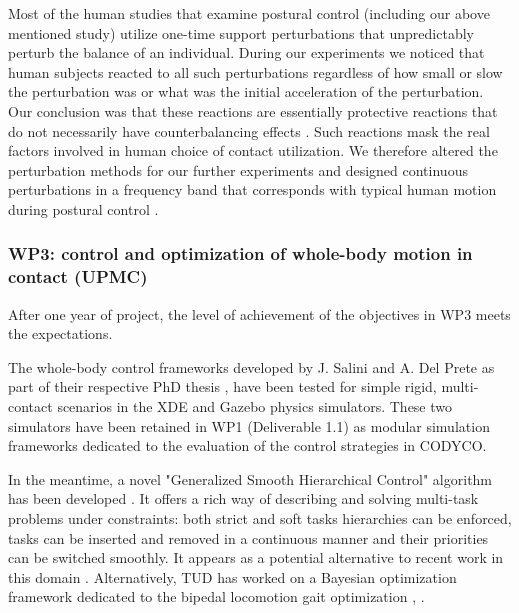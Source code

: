 \documentclass[12pt,a4paper,twoside]{article}
\begin{document}
Most of the human studies that examine postural control \cite{Horak1986, Henry1998, Dimitrova2004} (including our above mentioned study) utilize one-time support perturbations that unpredictably perturb the balance of an individual. During our experiments we noticed that human subjects reacted to all such perturbations regardless of how small or slow the perturbation was or what was the initial acceleration of the perturbation. Our conclusion was that these reactions are essentially protective reactions that do not necessarily have counterbalancing effects \cite{McIlroy1995, Corbeil2013}. Such reactions mask the real factors involved in human choice of contact utilization. We therefore altered the perturbation methods for our further experiments and designed continuous perturbations in a frequency band that corresponds with typical human motion during postural control \cite{Nawayseh2006}.


\subsubsection{WP3: control and optimization of whole-body motion in contact (UPMC)}

After one year of project, the level of achievement of the objectives in WP3 meets the expectations.

The whole-body control frameworks developed by J. Salini and A. Del Prete as part of their respective PhD thesis \cite{salini2012}, \cite{delprete2013} have been tested for simple rigid, multi-contact scenarios in the XDE \cite{XDE} and Gazebo \cite{Gazebo} physics simulators. These two simulators have been retained in WP1 (Deliverable 1.1) as modular simulation frameworks dedicated to the evaluation of the control strategies in CODYCO.

In the meantime, a novel "Generalized Smooth Hierarchical Control" algorithm has been developed \cite{liu2013}. It offers a rich way of describing and solving multi-task problems under constraints: both strict and soft tasks hierarchies can be enforced, tasks can be inserted and removed in a continuous manner and their priorities can be switched smoothly. It appears as a potential alternative to recent work in this domain \cite{escande2012}. Alternatively, TUD has worked on a Bayesian optimization framework dedicated to the bipedal locomotion gait optimization \cite{calandra2014}, \cite{calandra2014b}.
\end{document}
